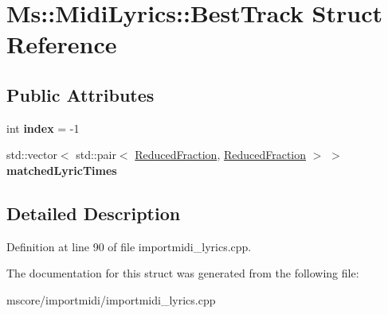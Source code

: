 \hypertarget{struct_ms_1_1_midi_lyrics_1_1_best_track}{}\section{Ms\+:\+:Midi\+Lyrics\+:\+:Best\+Track Struct Reference}
\label{struct_ms_1_1_midi_lyrics_1_1_best_track}
\subsection*{Public Attributes}
\begin{DoxyCompactItemize}
\item 
\mbox{\label{struct_ms_1_1_midi_lyrics_1_1_best_track_a727829da4804cc81721a3bf6e1d71a5e}} 
int {\bfseries index} = -\/1
\item 
\mbox{\label{struct_ms_1_1_midi_lyrics_1_1_best_track_a6a99305c4a44bbc4ecb6db8aaca29e8f}} 
std\+::vector$<$ std\+::pair$<$ \hyperlink{class_ms_1_1_reduced_fraction}{Reduced\+Fraction}, \hyperlink{class_ms_1_1_reduced_fraction}{Reduced\+Fraction} $>$ $>$ {\bfseries matched\+Lyric\+Times}
\end{DoxyCompactItemize}


\subsection{Detailed Description}


Definition at line 90 of file importmidi\+\_\+lyrics.\+cpp.



The documentation for this struct was generated from the following file\+:\begin{DoxyCompactItemize}
\item 
mscore/importmidi/importmidi\+\_\+lyrics.\+cpp\end{DoxyCompactItemize}
